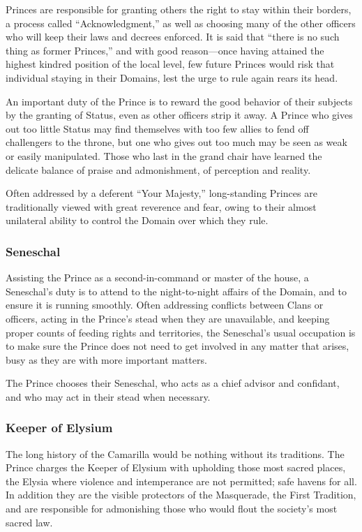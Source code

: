 Princes are responsible for granting others the right to stay within their borders, a process 
called ``Acknowledgment,'' as well as choosing many of the other officers who will keep their 
laws and decrees enforced.  It is said that ``there is no such thing as former Princes,'' and with 
good reason---once having attained the highest kindred position of the local level, few future 
Princes would risk that individual staying in their Domains, lest the urge to rule again rears its 
head.

An important duty of the Prince is to reward the good behavior of their subjects by the granting of 
Status, even as other officers strip it away.  A Prince who gives out too little Status may find 
themselves with too few allies to fend off challengers to the throne, but one who gives out too much 
may be seen as weak or easily manipulated.  Those who last in the grand chair have learned the delicate 
balance of praise and admonishment, of perception and reality.

Often addressed by a deferent ``Your Majesty,'' long-standing Princes are traditionally viewed with 
great reverence and fear, owing to their almost unilateral ability to control the Domain over which 
they rule.

\subsubsection{Seneschal}
Assisting the Prince as a second-in-command or master of the house, a Seneschal's duty is to 
attend to the night-to-night affairs of the Domain, and to ensure it is running smoothly.  
Often addressing conflicts between Clans or officers, acting in the Prince's stead when they are 
unavailable, and keeping proper counts of feeding rights and territories, the Seneschal's 
usual occupation is to make sure the Prince does not need to get involved in any matter that 
arises, busy as they are with more important matters.

The Prince chooses their Seneschal, who acts as a chief advisor and confidant, and who may 
act in their stead when necessary.

\subsubsection{Keeper of Elysium}
The long history of the Camarilla would be nothing without its traditions.  The Prince 
charges the Keeper of Elysium with upholding those most sacred places, the Elysia 
where violence and intemperance are not permitted; safe havens for all.  In addition 
they are the visible protectors of the Masquerade, the First Tradition, and are responsible 
for admonishing those who would flout the society's most sacred law.  

